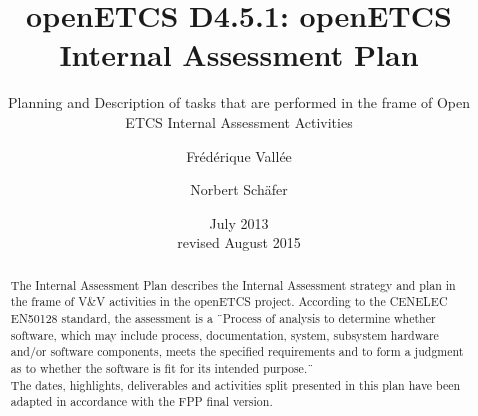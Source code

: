 \documentclass[openetcs]{template/openetcs_article}
\begin{document}
\frontmatter
{}




\title{openETCS D4.5.1: openETCS Internal Assessment Plan}

\subtitle{Planning and Description of tasks that are performed in the frame of Open ETCS Internal Assessment Activities}

\date{July 2013\\revised August 2015}







\author{Fr\'ed\'erique Vall\'ee}


\author{Norbert Sch\"afer}









\begin{abstract}
The Internal Assessment Plan describes the Internal Assessment strategy and plan in the frame of V\&V activities in the openETCS \cite{openETCS} project.
According to the CENELEC EN50128 \cite{EN50128} standard, the assessment is a \"\ Process of analysis to determine whether software, which may include
process, documentation, system, subsystem hardware and/or software components, meets the specified requirements and to form a judgment as to whether the
software is fit for its intended purpose.\"\
\\
The dates, highlights, deliverables and activities split presented in this plan have been adapted in accordance with the FPP \cite{FPP} final version.
\end{abstract}
\end{document}
